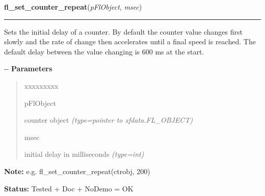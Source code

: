     \vspace{0.5ex}

\hspace{.8\funcindent}\begin{boxedminipage}{\funcwidth}

    \raggedright \textbf{fl\_set\_counter\_repeat}(\textit{pFlObject}, \textit{msec})

    \vspace{-1.5ex}

    \rule{\textwidth}{0.5\fboxrule}
\setlength{\parskip}{2ex}

Sets the initial delay of a counter. By default the counter value
changes first slowly and the rate of change then accelerates until a
final speed is reached. The default delay between the value changing
is 600 ms at the start.

-{}-
\setlength{\parskip}{1ex}
      \textbf{Parameters}
      \vspace{-1ex}

      \begin{quote}
        \begin{Ventry}{xxxxxxxxx}

          \item[pFlObject]


counter object
            {\it (type=pointer to xfdata.FL\_OBJECT)}

          \item[msec]


initial delay in milliseconds
            {\it (type=int)}

        \end{Ventry}

      \end{quote}

\textbf{Note:} 
e.g. fl\_set\_counter\_repeat(ctrobj, 200)


\textbf{Status:} 
Tested + Doc + NoDemo = OK


    \end{boxedminipage}

    \label{xformslib:flcounter:fl_get_counter_min_repeat}

    \vspace{0.5ex}

